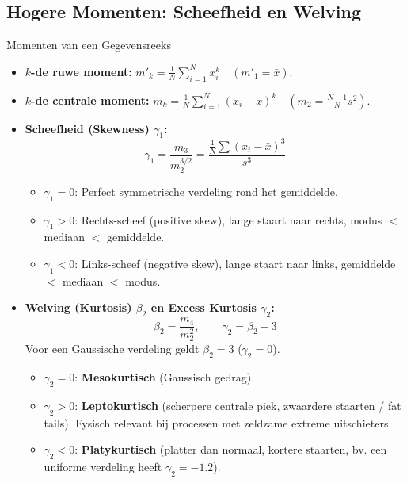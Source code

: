 \documentclass[11pt,a4paper]{article}
\begin{document}
\subsection{Hogere Momenten: Scheefheid en Welving}
\begin{defbox}{Momenten van een Gegevensreeks}
\begin{itemize}[leftmargin=1.2em]
    \item \textbf{$k$-de ruwe moment:} $m'_k = \frac{1}{N} \sum_{i=1}^N x_i^k \quad (m'_1 = \bar{x})$.
    \item \textbf{$k$-de centrale moment:} $m_k = \frac{1}{N} \sum_{i=1}^N (x_i - \bar{x})^k \quad (m_2 = \frac{N-1}{N}s^2)$.
    \item \textbf{Scheefheid (Skewness) $\gamma_1$:}
    \begin{equation}
        \gamma_1 = \frac{m_3}{m_2^{3/2}} = \frac{\frac{1}{N}\sum (x_i - \bar{x})^3}{s^3}
    \end{equation}
    \begin{itemize}
        \item $\gamma_1 = 0$: Perfect symmetrische verdeling rond het gemiddelde.
        \item $\gamma_1 > 0$: Rechts-scheef (positive skew), lange staart naar rechts, modus $<$ mediaan $<$ gemiddelde.
        \item $\gamma_1 < 0$: Links-scheef (negative skew), lange staart naar links, gemiddelde $<$ mediaan $<$ modus.
    \end{itemize}
    \item \textbf{Welving (Kurtosis) $\beta_2$ en Excess Kurtosis $\gamma_2$:}
    \begin{equation}
        \beta_2 = \frac{m_4}{m_2^2}, \qquad \gamma_2 = \beta_2 - 3
    \end{equation}
    Voor een Gaussische verdeling geldt $\beta_2 = 3$ ($\gamma_2 = 0$).
    \begin{itemize}
        \item $\gamma_2 = 0$: \textbf{Mesokurtisch} (Gaussisch gedrag).
        \item $\gamma_2 > 0$: \textbf{Leptokurtisch} (scherpere centrale piek, zwaardere staarten / fat tails). Fysisch relevant bij processen met zeldzame extreme uitschieters.
        \item $\gamma_2 < 0$: \textbf{Platykurtisch} (platter dan normaal, kortere staarten, bv. een uniforme verdeling heeft $\gamma_2 = -1.2$).
    \end{itemize}
\end{itemize}
\end{defbox}
\end{document}
